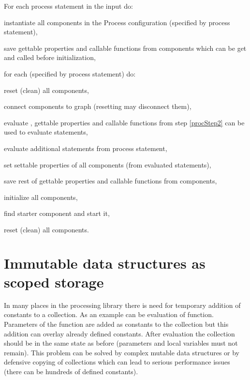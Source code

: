 For each process statement in the input do:
\begin{enumerate*}
	\item instantiate all components in the Process configuration (specified by process statement),
	\item \label{procStep2} save gettable properties and callable functions from components which can be get and called before initialization,
	\item for each \lsystem (specified by process statement) do:
	\begin{enumerate*}
		\item reset (clean) all components,
		\item connect components to graph (resetting may disconnect them),
		\item evaluate \lsystem, gettable properties and callable functions from step \ref{procStep2} can be used to evaluate \lsystem statements,
		\item evaluate additional \lsystem statements from process statement,
		\item set settable properties of all components (from evaluated \lsystem statements),
		\item save rest of gettable properties and callable functions from components,
		\item initialize all components,
		\item find starter component and start it,
	\end{enumerate*}
	\item reset (clean) all components.
\end{enumerate*}


\section{Immutable data structures as scoped storage}
\label{sec:immutableDs}

In many places in the \lsystem processing library there is need for temporary addition of constants to a collection.
As an example can be evaluation of function.
Parameters of the function are added as constants to the collection but this addition can overlay already defined constants.
After evaluation the collection should be in the same state as before (parameters and local variables must not remain).
This problem can be solved by complex mutable data structures or by defensive copying of collections which can lead to serious performance issues (there can be hundreds of defined constants).

